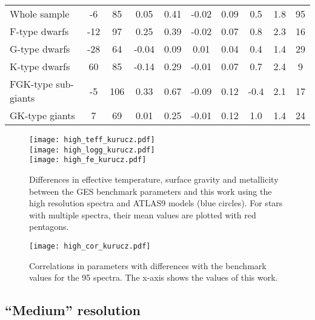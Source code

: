 \documentclass[fleqn,usenatbib]{mnras}
\begin{document}
\begin{table*}
\begin{center}
\begin{tabular}{lccccccccc}
Whole sample         & -6  & 85  & 0.05  & 0.41 & -0.02 & 0.09 & 0.5  & 1.8 & 95 \\
F-type dwarfs        & -12 & 97  & 0.25  & 0.39 & -0.02 & 0.07 & 0.8  & 2.3 & 16 \\
G-type dwarfs        & -28 & 64  & -0.04 & 0.09 & 0.01  & 0.04 & 0.4  & 1.4 & 29 \\
K-type dwarfs        & 60  & 85  & -0.14 & 0.29 & -0.01 & 0.07 & 0.7  & 2.4 & 9  \\
FGK-type sub-giants  & -5  & 106 & 0.33  & 0.67 & -0.09 & 0.12 & -0.4 & 2.1 & 17 \\
GK-type giants       & 7   & 69  & 0.01  & 0.25 & -0.01 & 0.12 & 1.0  & 1.4 & 24 \\
\hline
\end{tabular}
\end{center}
\end{table*}

\begin{figure}
  \centering
   \texttt{[image: high\_teff\_kurucz.pdf]} \\
   \texttt{[image: high\_logg\_kurucz.pdf]} \\
   \texttt{[image: high\_fe\_kurucz.pdf]}
  \caption{Differences in effective temperature, surface gravity and metallicity between the GES benchmark parameters and this work using the high resolution spectra and ATLAS9 models 
  (blue circles). For stars with multiple spectra, their mean values are plotted with red pentagons. }
  \label{high_res}
\end{figure}

\begin{figure*}
  \centering
   \texttt{[image: high\_cor\_kurucz.pdf]}
  \caption{Correlations in parameters with differences with the benchmark values for the 95 spectra. The x-axis shows the values of this work.}
  \label{high_cor_kurucz}
\end{figure*}

\subsection{``Medium'' resolution}
\end{document}
